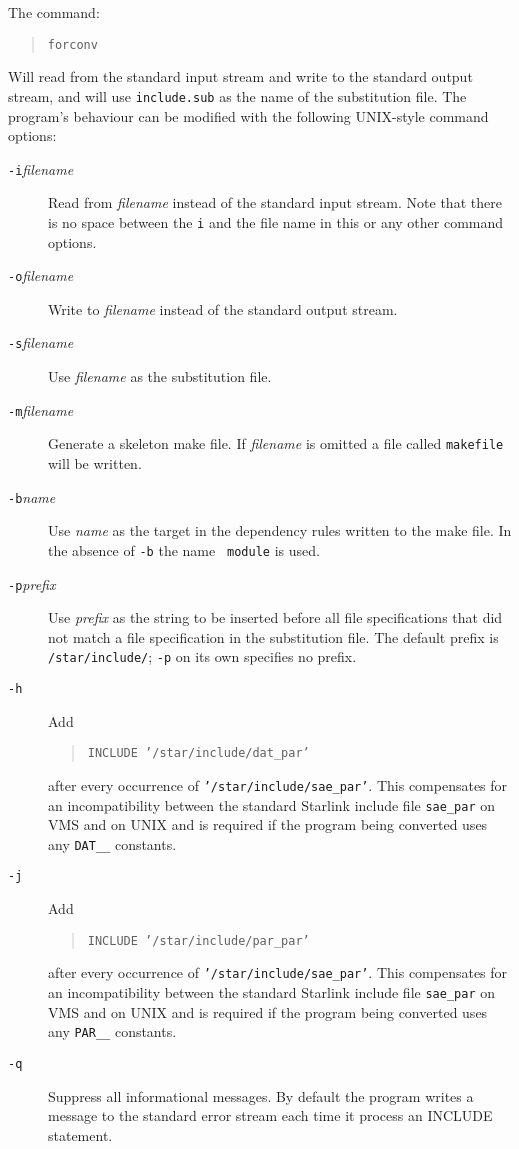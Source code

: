 The command:
\begin{quote}
{\tt forconv}
\end{quote}
Will read from the standard input stream and write to the standard output
stream, and will use {\tt include.sub} as the name of the substitution file.
The program's behaviour can be modified with the following UNIX-style
command options:
\begin{description}

\item[{\tt -i}{\em filename}] Read from {\em filename} instead of the
standard input stream. Note that there is no space between the {\tt i}
and the file name in this or any other command options.

\item[{\tt -o}{\em filename}] Write to {\em filename} instead of the
standard output stream.

\item[{\tt -s}{\em filename}] Use {\em filename} as the substitution file.

\item[{\tt -m}{\em filename}] Generate a skeleton make file. If {\em
filename} is omitted a file called {\tt makefile} will be written.

\item[{\tt -b}{\em name}] Use {\em name} as the target in the dependency
rules written to the make file. In the absence of {\tt -b} the name {\tt
module} is used.

\item[{\tt -p}{\em prefix}] Use {\em prefix} as the string to be inserted
before all file specifications that did not match a file specification
in the substitution file. The default prefix is {\tt /star/include/};
{\tt -p} on its own specifies no prefix.

\item[{\tt -h}] Add
\begin{quote}
{\tt INCLUDE '/star/include/dat\_par'}
\end{quote}
after every occurrence of {\tt '/star/include/sae\_par'}. This
compensates for an incompatibility between the standard Starlink include
file {\tt sae\_par} on VMS and on
UNIX and is required if the program being converted uses any {\tt DAT\_\_}
constants.

\item[{\tt -j}] Add
\begin{quote}
{\tt INCLUDE '/star/include/par\_par'}
\end{quote}
after every occurrence of {\tt '/star/include/sae\_par'}. This
compensates for an incompatibility between the standard Starlink include
file {\tt sae\_par} on VMS and on
UNIX and is required if the program being converted uses any {\tt PAR\_\_}
constants.

\item[{\tt -q}] Suppress all informational messages. By default the
program writes a message to the standard error stream each time it
process an INCLUDE statement.

\end{description}

